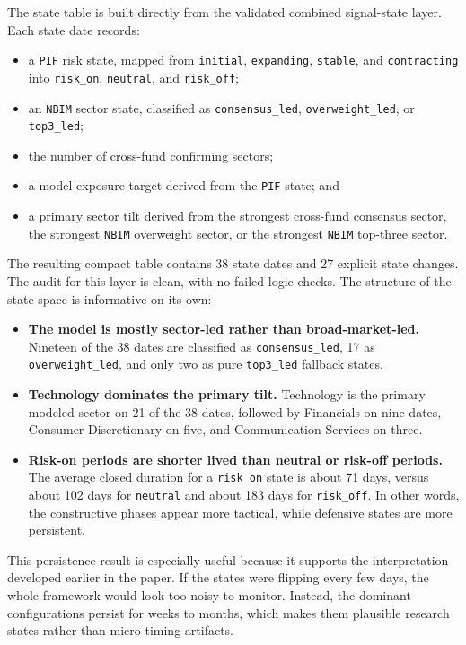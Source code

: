\documentclass[conference]{IEEEtran}
\begin{document}
The state table is built directly from the validated combined signal-state layer. Each state date records:
\begin{itemize}[leftmargin=1.4em]
    \item a \texttt{PIF} risk state, mapped from \texttt{initial}, \texttt{expanding}, \texttt{stable}, and \texttt{contracting} into \texttt{risk\_on}, \texttt{neutral}, and \texttt{risk\_off};
    \item an \texttt{NBIM} sector state, classified as \texttt{consensus\_led}, \texttt{overweight\_led}, or \texttt{top3\_led};
    \item the number of cross-fund confirming sectors;
    \item a model exposure target derived from the \texttt{PIF} state; and
    \item a primary sector tilt derived from the strongest cross-fund consensus sector, the strongest \texttt{NBIM} overweight sector, or the strongest \texttt{NBIM} top-three sector.
\end{itemize}

The resulting compact table contains 38 state dates and 27 explicit state changes. The audit for this layer is clean, with no failed logic checks. The structure of the state space is informative on its own:
\begin{itemize}[leftmargin=1.4em]
    \item \textbf{The model is mostly sector-led rather than broad-market-led.} Nineteen of the 38 dates are classified as \texttt{consensus\_led}, 17 as \texttt{overweight\_led}, and only two as pure \texttt{top3\_led} fallback states.
    \item \textbf{Technology dominates the primary tilt.} Technology is the primary modeled sector on 21 of the 38 dates, followed by Financials on nine dates, Consumer Discretionary on five, and Communication Services on three.
    \item \textbf{Risk-on periods are shorter lived than neutral or risk-off periods.} The average closed duration for a \texttt{risk\_on} state is about 71 days, versus about 102 days for \texttt{neutral} and about 183 days for \texttt{risk\_off}. In other words, the constructive phases appear more tactical, while defensive states are more persistent.
\end{itemize}

This persistence result is especially useful because it supports the interpretation developed earlier in the paper. If the states were flipping every few days, the whole framework would look too noisy to monitor. Instead, the dominant configurations persist for weeks to months, which makes them plausible research states rather than micro-timing artifacts.
\end{document}
